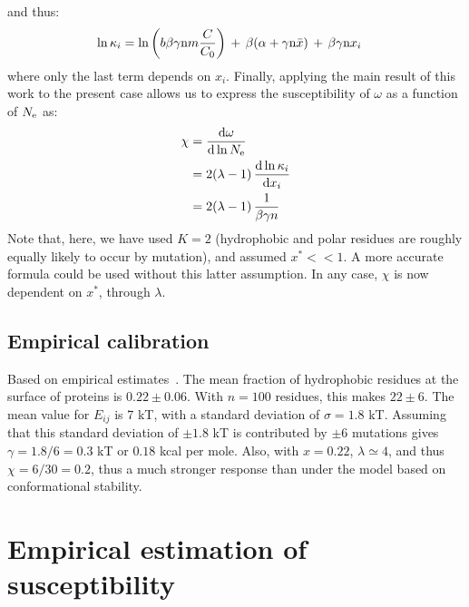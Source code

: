 and thus:
\begin{align}
\ln \kappa_i & = \ln \left( b \beta \gamma \text{n} m \frac{C}{C_0}  \right) \, + \, \beta (\alpha +\gamma \text{n} \bar x) \, + \, \beta \gamma\text{n} x_i
\end{align}
where only the last term depends on $x_i$.
Finally, applying the main result of this work to the present case allows us to express the susceptibility of $\omega$ as a function of $N_{\mathrm{e}}$ as:
\begin{align}
\chi & = \frac{\mathrm{d}\omega} {\mathrm{d} \ln N_{\mathrm{e}}} 
\\ & =  2(\lambda - 1) \, \frac{\mathrm{d}\ln \kappa_i}{\mathrm{d} x_i} 
\\ & =  2 (\lambda - 1) \, \frac{1}{\beta \gamma n}
\end{align}
Note that, here, we have used $K=2$ (hydrophobic and polar residues are roughly equally likely to occur by mutation), and assumed $x^* << 1$. A more accurate formula could be used without this latter assumption. In any case, $\chi$ is now dependent on $x^*$, through $\lambda$.
\subsection{Empirical calibration}
Based on empirical estimates~\citep{Zhang2008}. The mean fraction of hydrophobic residues at the surface of proteins is $0.22 \pm 0.06$. With $n=100$ residues, this makes $22 \pm 6$. The mean value for $E_{ij}$ is 7 kT, with a standard deviation of $\sigma = 1.8$ kT. Assuming that this standard deviation of $\pm 1.8$ kT is contributed by $\pm 6$ mutations gives $\gamma = 1.8 / 6 = 0.3$ kT or $0.18$ kcal per mole. Also, with $x=0.22$, $\lambda \simeq 4$, and thus $\chi = 6  / 30 = 0.2$, thus a much stronger response than under the model based on conformational stability.

\section{Empirical estimation of susceptibility}

